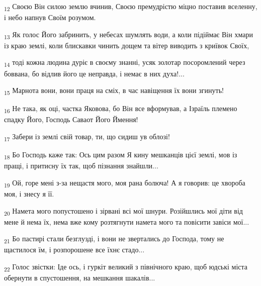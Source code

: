 \begin{tcolorbox}
\textsubscript{12} Своєю Він силою землю вчинив, Своєю премудрістю міцно поставив вселенну, і небо напнув Своїм розумом.
\end{tcolorbox}
\begin{tcolorbox}
\textsubscript{13} Як голос Його забринить, у небесах шумлять води, а коли підіймає Він хмари із краю землі, коли блискавки чинить дощем та вітер виводить з криївок Своїх,
\end{tcolorbox}
\begin{tcolorbox}
\textsubscript{14} тоді кожна людина дуріє в своєму знанні, усяк золотар посоромлений через боввана, бо відлив його це неправда, і немає в них духа!...
\end{tcolorbox}
\begin{tcolorbox}
\textsubscript{15} Марнота вони, вони праця на сміх, в час навіщення їх вони згинуть!
\end{tcolorbox}
\begin{tcolorbox}
\textsubscript{16} Не така, як оці, частка Яковова, бо Він все вформував, а Ізраїль племено спадку Його, Господь Саваот Його Ймення!
\end{tcolorbox}
\begin{tcolorbox}
\textsubscript{17} Забери із землі свій товар, ти, що сидиш ув облозі!
\end{tcolorbox}
\begin{tcolorbox}
\textsubscript{18} Бо Господь каже так: Ось цим разом Я кину мешканців цієї землі, мов із пращі, і притисну їх так, щоб пізнання знайшли...
\end{tcolorbox}
\begin{tcolorbox}
\textsubscript{19} Ой, горе мені з-за нещастя мого, моя рана болюча! А я говорив: це хвороба моя, і знесу я її.
\end{tcolorbox}
\begin{tcolorbox}
\textsubscript{20} Намета мого попустошено і зірвані всі мої шнури. Розійшлись мої діти від мене й нема їх, нема вже кому розтягнути намета мого та повісити завіси мої...
\end{tcolorbox}
\begin{tcolorbox}
\textsubscript{21} Бо пастирі стали безглузді, і вони не звертались до Господа, тому не щастилося їм, і розпорошене все їхнє стадо...
\end{tcolorbox}
\begin{tcolorbox}
\textsubscript{22} Голос звістки: Іде ось, і гуркіт великий з північного краю, щоб юдські міста обернути в спустошення, на мешкання шакалів...
\end{tcolorbox}
